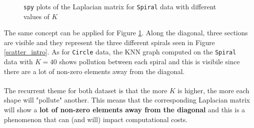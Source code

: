 \begin{figure}[H]
    \caption{\texttt{spy} plots of the Laplacian matrix for \texttt{Spiral} data with different values of \(K\)}
    \label{LaplacianSpy_spiral}
  \end{figure}
  The same concept can be applied for Figure \ref{LaplacianSpy_spiral}. Along the diagonal, three sections are visible and they represent the three different spirals seen in Figure \ref{scatter_intro}. As for \texttt{Circle} data, the KNN graph computed on the \texttt{Spiral} data with \(K= 40\) shows pollution between each spiral and this is visibile since there are a lot of non-zero elements away from the diagonal.
  \\
\\
The recurrent theme for both dataset is that the more \(K\) is higher, the more each shape will "pollute" another. This means that the corresponding Laplacian matrix will show a \textbf{lot of non-zero elements away from the diagonal} and this is a phenomenon that can (and will) impact computational costs.